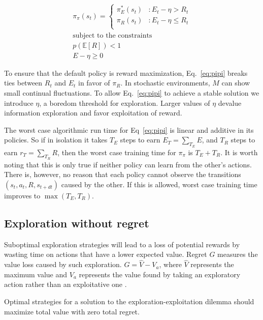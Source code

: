 \documentclass[9pt,twocolumn,twoside]{pnas-new}
\begin{document}
\begin{equation}
\label{eq:pipi} 
	\begin{split}
		\pi_{\pi}(s_t) = 
		\begin{cases}
			\pi^*_E(s_t) & : E_t - \eta > R_t \\
			\pi_R(s_t) & : E_t - \eta \le R_t \\
		\end{cases}
		\\
		\text{subject to the constraints}\\
		p(\mathbb E[R]) < 1 \\
		E - \eta \geq 0
	\end{split}
\end{equation}

To ensure that the default policy is reward maximization, Eq.~\ref{eq:pipi} breaks ties between $R_t$ and $E_t$ in favor of $\pi_R$. In stochastic environments, $M$ can show small continual fluctuations. To allow Eq.~\ref{eq:pipi} to achieve a stable solution we introduce $\eta$, a boredom threshold for exploration. Larger values of $\eta$ devalue information exploration and favor exploitation of reward.

 The worst case algorithmic run time for Eq~\ref{eq:pipi} is linear and additive in its policies. So if in isolation it takes $T_E$ steps to earn $E_{T} = \sum_{T_E} E$, and $T_R$ steps to earn $r_{T} = \sum_{T_R} R$, then the worst case training time for $\pi_{\pi}$ is $T_E + T_R$. It is worth noting that this is only true if neither policy can learn from the other's actions. There is, however, no reason that each policy cannot observe the transitions $(s_t, a_t, R, s_{t+dt})$ caused by the other. If this is allowed, worst case training time improves to $\max(T_E, T_R)$.

\subsection*{Exploration without regret} Suboptimal exploration strategies will lead to a loss of potential rewards by wasting time on actions that have a lower expected value. Regret $G$ measures the value loss caused by such exploration. $G = \hat V - V_a$, where $\hat V$ represents the maximum value and $V_a$ represents the value found by taking an exploratory action rather than an exploitative one \cite{Sutton2018}. 

Optimal strategies for a solution to the exploration-exploitation dilemma should maximize total value with zero total regret. 
\end{document}
